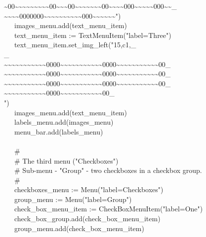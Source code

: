 {\>\>\~{}00\~{}\~{}\~{}\~{}\~{}\~{}\~{}\~{}\~{}00\~{}\~{}\~{}00\~{}\~{}\~{}\~{}\~{}\~{}\~{}00\~{}\~{}\~{}\~{}000\~{}\~{}\~{}\~{}\~{}000\~{}\~{}\_ \\
\>\>\~{}\~{}\~{}\~{}0000000\~{}\~{}\~{}\~{}\~{}\~{}\~{}\~{}\~{}\~{}000\~{}\~{}\~{}\~{}\~{}\~{}") \\
\>   \ \ \ images\_menu.add(text\_menu\_item) \\
\>   \ \ \ text\_menu\_item :=
TextMenuItem("label=Three") \\
\>   \ \ \ text\_menu\_item.set\_img\_left("15,c1,\_ \\
\>\_ \\
\>\~{}\~{}\~{}\~{}\~{}\~{}\~{}\~{}\~{}\~{}\~{}0000\~{}\~{}\~{}\~{}\~{}\~{}\~{}\~{}\~{}\~{}\~{}0000\~{}\~{}\~{}\~{}\~{}\~{}\~{}\~{}\~{}\~{}\~{}00\_ \\
\>\~{}\~{}\~{}\~{}\~{}\~{}\~{}\~{}\~{}\~{}\~{}0000\~{}\~{}\~{}\~{}\~{}\~{}\~{}\~{}\~{}\~{}\~{}0000\~{}\~{}\~{}\~{}\~{}\~{}\~{}\~{}\~{}\~{}\~{}00\_ \\
\>\~{}\~{}\~{}\~{}\~{}\~{}\~{}\~{}\~{}\~{}\~{}0000\~{}\~{}\~{}\~{}\~{}\~{}\~{}\~{}\~{}\~{}\~{}0000\~{}\~{}\~{}\~{}\~{}\~{}\~{}\~{}\~{}\~{}\~{}00\_ \\
\>\~{}\~{}\~{}\~{}\~{}\~{}\~{}\~{}\~{}\~{}\~{}0000\~{}\~{}\~{}\~{}\~{}\~{}\~{}\~{}\~{}\~{}\~{}00\_ \\
\>") \\
\>   \ \ \ images\_menu.add(text\_menu\_item) \\
\>   \ \ \ labels\_menu.add(images\_menu) \\
\>   \ \ \ menu\_bar.add(labels\_menu) \\
\ \\
\>   \ \ \ \# \\
\>   \ \ \ \# The third menu
("Checkboxes") \\
\>   \ \ \ \# Sub-menu - "Group" - two
checkboxes in a checkbox group. \\
\>   \ \ \ \# \\
\>   \ \ \ checkboxes\_menu :=
Menu("label=Checkboxes") \\
\>   \ \ \ group\_menu :=
Menu("label=Group") \\
\>   \ \ \ check\_box\_menu\_item :=
CheckBoxMenuItem("label=One") \\
\>   \ \ \ check\_box\_group.add(check\_box\_menu\_item) \\
\>   \ \ \ group\_menu.add(check\_box\_menu\_item) \\
}

